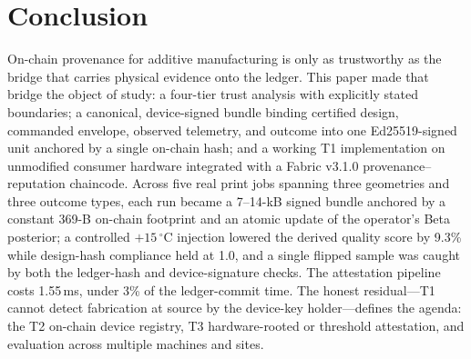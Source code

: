 \section{Conclusion}
\label{sec:conclusion}

On-chain provenance for additive manufacturing is only as trustworthy as
the bridge that carries physical evidence onto the ledger.  This paper
made that bridge the object of study: a four-tier trust analysis with
explicitly stated boundaries; a canonical, device-signed bundle binding
certified design, commanded envelope, observed telemetry, and outcome
into one Ed25519-signed unit anchored by a single on-chain hash; and a
working T1 implementation on unmodified consumer hardware integrated with
a Fabric v3.1.0 provenance--reputation chaincode.  Across five real print
jobs spanning three geometries and three outcome types, each run became a
7--14-kB signed bundle anchored by a constant 369-B on-chain footprint and
an atomic update of the operator's Beta posterior; a controlled
$+15\,^{\circ}$C injection lowered the derived quality score by 9.3\% while
design-hash compliance held at 1.0, and a single flipped sample was caught
by both the ledger-hash and device-signature checks.  The attestation
pipeline costs 1.55\,ms, under 3\% of the ledger-commit time.  The honest
residual---T1 cannot detect fabrication at source by the device-key
holder---defines the agenda: the T2 on-chain device registry, T3
hardware-rooted or threshold attestation, and evaluation across multiple
machines and sites.
